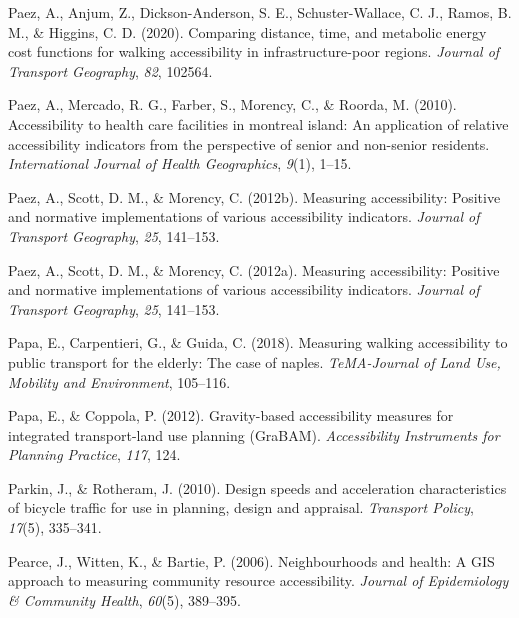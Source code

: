 \documentclass[
11pt, %
oneside, %
english, %
singlespacing, %
]{macthesis} %
\newlength{\cslhangindent}
\newenvironment{CSLReferences}[2] %
 {%
  \setlength{\parindent}{0pt}
  \ifodd #1 \everypar{\setlength{\hangindent}{\cslhangindent}}\ignorespaces\fi
  \ifnum #2 > 0
  \setlength{\parskip}{#2\baselineskip}
  \fi
 }%
 {}
\begin{document}
\begin{CSLReferences}{1}{0}
\leavevmode{}%
Paez, A., Anjum, Z., Dickson-Anderson, S. E., Schuster-Wallace, C. J., Ramos, B. M., \& Higgins, C. D. (2020). Comparing distance, time, and metabolic energy cost functions for walking accessibility in infrastructure-poor regions. \emph{Journal of Transport Geography}, \emph{82}, 102564.

\leavevmode{}%
Paez, A., Mercado, R. G., Farber, S., Morency, C., \& Roorda, M. (2010). Accessibility to health care facilities in montreal island: An application of relative accessibility indicators from the perspective of senior and non-senior residents. \emph{International Journal of Health Geographics}, \emph{9}(1), 1--15.

\leavevmode{}%
Paez, A., Scott, D. M., \& Morency, C. (2012b). Measuring accessibility: Positive and normative implementations of various accessibility indicators. \emph{Journal of Transport Geography}, \emph{25}, 141--153.

\leavevmode{}%
Paez, A., Scott, D. M., \& Morency, C. (2012a). Measuring accessibility: Positive and normative implementations of various accessibility indicators. \emph{Journal of Transport Geography}, \emph{25}, 141--153.

\leavevmode{}%
Papa, E., Carpentieri, G., \& Guida, C. (2018). Measuring walking accessibility to public transport for the elderly: The case of naples. \emph{TeMA-Journal of Land Use, Mobility and Environment}, 105--116.

\leavevmode{}%
Papa, E., \& Coppola, P. (2012). Gravity-based accessibility measures for integrated transport-land use planning (GraBAM). \emph{Accessibility Instruments for Planning Practice}, \emph{117}, 124.

\leavevmode{}%
Parkin, J., \& Rotheram, J. (2010). Design speeds and acceleration characteristics of bicycle traffic for use in planning, design and appraisal. \emph{Transport Policy}, \emph{17}(5), 335--341.

\leavevmode{}%
Pearce, J., Witten, K., \& Bartie, P. (2006). Neighbourhoods and health: A GIS approach to measuring community resource accessibility. \emph{Journal of Epidemiology \& Community Health}, \emph{60}(5), 389--395.


\end{CSLReferences}
\end{document}
